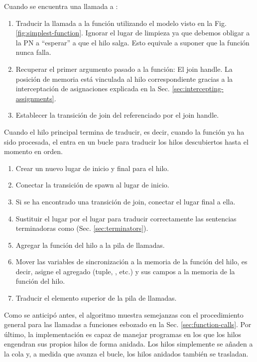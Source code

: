 Cuando se encuentra una llamada a :

\begin{enumerate}
      \item Traducir la llamada a la función utilizando el modelo visto en la Fig. \ref{fig:simplest-function}.
            Ignorar el lugar de limpieza ya que debemos obligar a la \acrshort{PN} a ``esperar'' a que el hilo salga. Esto
            equivale a suponer que la función  nunca falla.
      \item Recuperar el primer argumento pasado a la función: El join handle. La posición de
            memoria está vinculada al hilo correspondiente gracias a la interceptación de
            asignaciones explicada en la Sec. \ref{sec:intercepting-assignments}.
      \item Establecer la transición de join del  referenciado por el join handle.
\end{enumerate}

Cuando el hilo principal termina de traducir, es decir, cuando la función  ya ha
sido procesada, el  entra en un bucle para traducir los hilos descubiertos hasta el
momento en orden.

\begin{enumerate}
      \item Crear un nuevo lugar de inicio y final para el hilo.
      \item Conectar la transición de spawn al lugar de inicio.
      \item Si se ha encontrado una transición de join, conectar el lugar final a ella.
      \item Sustituir el lugar  por el lugar  para traducir
            correctamente las sentencias terminadoras como  (Sec. \ref{sec:terminators}).
      \item Agregar la función del hilo a la pila de llamadas.
      \item Mover las variables de sincronización a la memoria de la función del hilo, es decir, asigne
            el agregado (tuple, , etc.) y sus campos a la memoria de la función del hilo.
      \item Traducir el elemento superior de la pila de llamadas.
\end{enumerate}

Como se anticipó antes, el algoritmo muestra semejanzas con el procedimiento general para las
llamadas a funciones esbozado en la Sec. \ref{sec:function-calls}.
Por último, la implementación es capaz de manejar programas
en los que los hilos engendran sus propios hilos de forma anidada.
Los hilos simplemente se añaden a la cola y, a medida que avanza el bucle,
los hilos anidados también se trasladan.